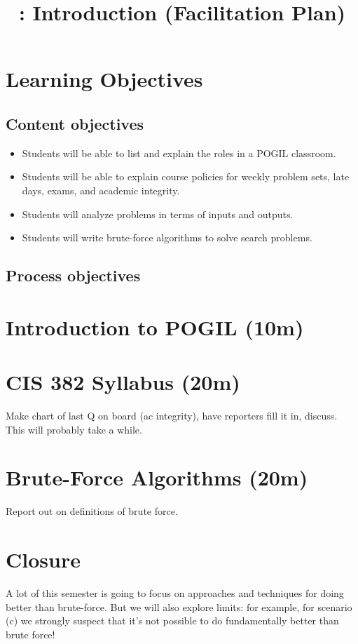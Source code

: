 \documentclass{tufte-handout}
\title{\thecourse: Introduction (Facilitation Plan)}
\date{}
\begin{document}
\maketitle

\section{Learning Objectives}

\subsection{Content objectives}

\begin{itemize}
\item Students will be able to list and explain the roles in a POGIL
  classroom.
\item Students will be able to explain course policies for weekly problem
  sets, late days, exams, and academic integrity.
\item Students will analyze problems in terms of inputs and outputs.
\item Students will write brute-force algorithms to solve search
  problems.
\end{itemize}

\subsection{Process objectives}

\section{Introduction to POGIL (10m)}

\section{CIS 382 Syllabus (20m)}

Make chart of last Q on board (ac integrity), have reporters fill it
in, discuss.  This will probably take a while.

\section{Brute-Force Algorithms (20m)}

Report out on definitions of brute force.

\section{Closure}

A lot of this semester is going to focus on approaches and techniques
for doing better than brute-force.  But we will also explore limits:
for example, for scenario (c) we strongly suspect that it's not
possible to do fundamentally better than brute force!
\end{document}
